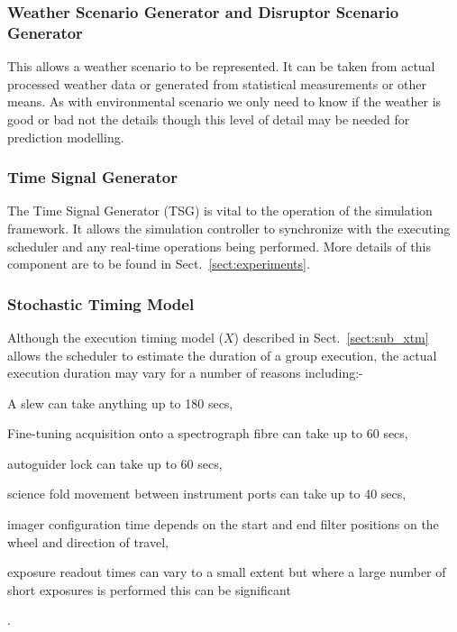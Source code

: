 \subsubsection{Weather Scenario Generator and Disruptor Scenario Generator}
\label{sect:sub_wsg}
This allows a weather scenario to be represented. It can be taken from actual processed weather data or generated from statistical measurements or other means. As with environmental scenario we only need to know if the weather is good or bad not the details though this level of detail may be needed for prediction modelling.

\subsubsection{Time Signal Generator}
\label{sect:sub_tsg}
The Time Signal Generator (TSG) is vital to the operation of the simulation framework. It allows the simulation controller to synchronize with the executing scheduler and any real-time operations being performed. More details of this component are to be found in Sect.~\ref{sect:experiments}.

\subsubsection{Stochastic Timing Model}
Although the execution timing model ($X$) described in Sect.~\ref{sect:sub_xtm} allows the scheduler to estimate the duration of a group execution, the actual execution duration may vary for a number of reasons including:-

\begin{inparaenum} \item A slew can take anything up to 180 secs, \item Fine-tuning acquisition onto a spectrograph fibre can take up to 60 secs, \item autoguider lock can take up to 60 secs, \item science fold movement between instrument ports can take up to 40 secs, \item imager configuration time depends on the start and end filter positions on the wheel and direction of travel, \item exposure readout times can vary to a small extent but where a large number of short exposures is performed this can be significant\end{inparaenum}.

